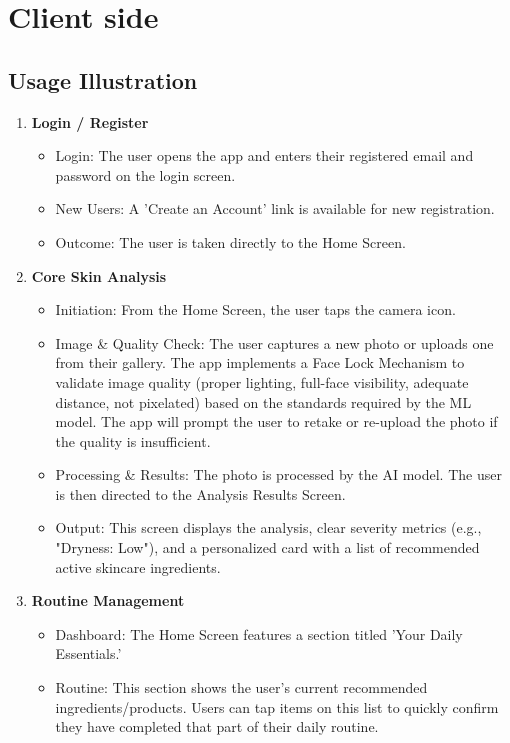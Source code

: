 \documentclass[12pt,a4paper]{article}
\begin{document}
\section{Client side}
\subsection{Usage Illustration}
\begin{enumerate}
    \item \textbf{Login / Register}
    \begin{itemize}
        \item Login: The user opens the app and enters their registered email and password on the login screen.
        \item New Users: A 'Create an Account' link is available for new registration.
        \item Outcome: The user is taken directly to the Home Screen.
    \end{itemize}
    \item \textbf{Core Skin Analysis}
    \begin{itemize}
        \item Initiation: From the Home Screen, the user taps the camera icon.
        \item Image \& Quality Check: The user captures a new photo or uploads one from their gallery. The app implements a Face Lock Mechanism to validate image quality (proper lighting, full-face visibility, adequate distance, not pixelated) based on the standards required by the ML model. The app will prompt the user to retake or re-upload the photo if the quality is insufficient.
        \item Processing \& Results: The photo is processed by the AI model. The user is then directed to the Analysis Results Screen.
        \item Output: This screen displays the analysis, clear severity metrics (e.g., "Dryness: Low"), and a personalized card with a list of recommended active skincare ingredients.
    \end{itemize}
    \item \textbf{Routine Management}
    \begin{itemize}
        \item Dashboard: The Home Screen features a section titled 'Your Daily Essentials.'
        \item Routine: This section shows the user's current recommended ingredients/products. Users can tap items on this list to quickly confirm they have completed that part of their daily routine.

\end{itemize}
\end{enumerate}
\end{document}
